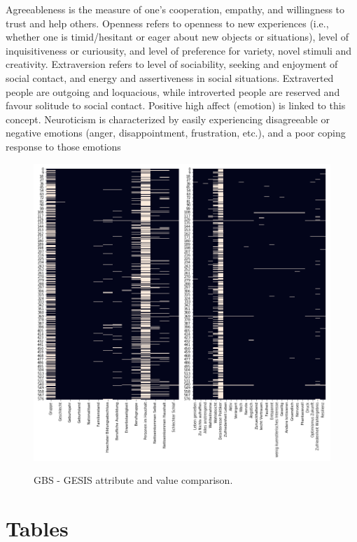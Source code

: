 \begin{appendices}
Agreeableness is the measure of one's cooperation, empathy, and willingness to trust and help others. Openness refers to openness to new experiences (i.e., whether one is timid/hesitant or eager about new objects or situations), level of inquisitiveness or curiousity, and level of preference for variety, novel stimuli and creativity. Extraversion refers to level of sociability, seeking and enjoyment of social contact, and energy and assertiveness in social situations. Extraverted people are outgoing and loquacious, while introverted people are reserved and favour solitude to social contact. Positive high affect (emotion) is linked to this concept. Neuroticism is characterized by easily experiencing disagreeable or negative emotions (anger, disappointment, frustration, etc.), and a poor coping response to those emotions

\begin{figure}[ht]
	\begin{center}
		\includegraphics[scale=0.52,angle=0]{fig/gbs_missing}
		\label{std}
		\caption{GBS - GESIS attribute and value comparison.}
	\end{center}
\end{figure}


\section{Tables}


\end{appendices}
